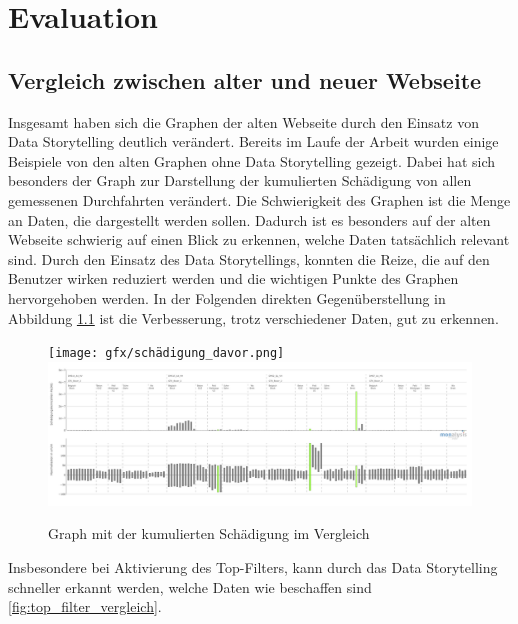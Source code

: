 \chapter{Evaluation}
\section{Vergleich zwischen alter und neuer Webseite}
Insgesamt haben sich die Graphen der alten Webseite durch den Einsatz von Data Storytelling deutlich verändert. Bereits im Laufe der Arbeit wurden einige Beispiele von den alten Graphen ohne Data Storytelling gezeigt. Dabei hat sich besonders der Graph zur Darstellung der kumulierten Schädigung von allen gemessenen Durchfahrten verändert. Die Schwierigkeit des Graphen ist die Menge an Daten, die dargestellt werden sollen. Dadurch ist es besonders auf der alten Webseite schwierig auf einen Blick zu erkennen, welche Daten tatsächlich relevant sind. Durch den Einsatz des Data Storytellings, konnten die Reize, die auf den Benutzer wirken reduziert werden und die wichtigen Punkte des Graphen hervorgehoben werden. In der Folgenden direkten Gegenüberstellung in Abbildung \ref{fig:schädigung_vergleich} ist die Verbesserung, trotz verschiedener Daten, gut zu erkennen.\\
\begin{figure}[!h]
    \centering
    \texttt{[image: gfx/schädigung\_davor.png]}
    \includegraphics[width=1\linewidth]{gfx/new_schaedigung.png}
    \caption{Graph mit der kumulierten Schädigung im Vergleich}
    \label{fig:schädigung_vergleich}
\end{figure}
\noindent
Insbesondere bei Aktivierung des Top-Filters, kann durch das Data Storytelling schneller erkannt werden, welche Daten wie beschaffen sind \ref{fig:top_filter_vergleich}. 
